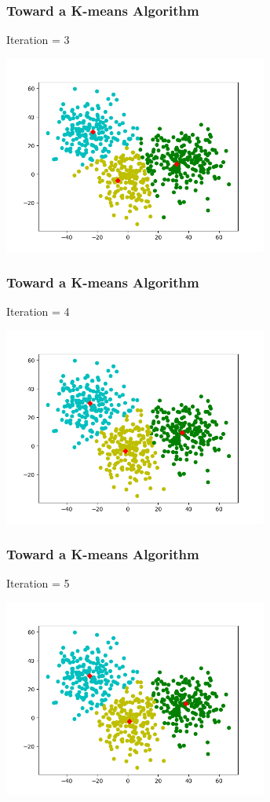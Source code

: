 \documentclass[9pt]{beamer}
\begin{document}
\begin{frame}
	\frametitle{Toward a K-means Algorithm}
	Iteration = 3
	\centerline{\includegraphics[width=0.65\textwidth]{figures/iteration3.png}}

\end{frame}

\begin{frame}
	\frametitle{Toward a K-means Algorithm}
	Iteration = 4
	\centerline{\includegraphics[width=0.65\textwidth]{figures/iteration4.png}}

\end{frame}

\begin{frame}
	\frametitle{Toward a K-means Algorithm}
	Iteration = 5
	\centerline{\includegraphics[width=0.65\textwidth]{figures/iteration5.png}}

\end{frame}
\end{document}
